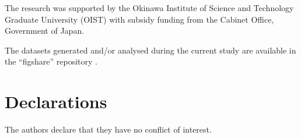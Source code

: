 \backmatter

The research was supported by the Okinawa Institute of Science and Technology Graduate	University (OIST) with subsidy funding from the Cabinet Office, Government of Japan. 

The datasets generated and/or analysed during the current study are available in the ``figshare'' repository \cite{negi_data2026}. 

\section*{Declarations}

The authors declare that they have no conflict of interest.










